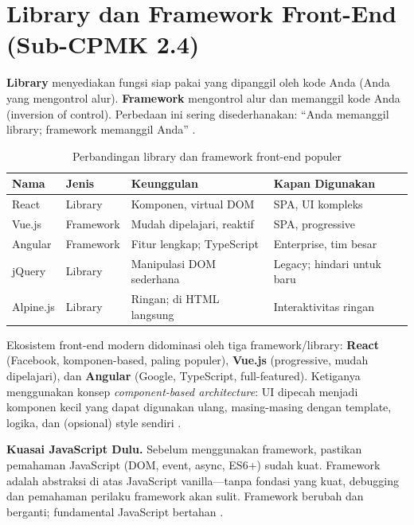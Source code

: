 \section{Library dan Framework Front-End (Sub-CPMK 2.4)}

\textbf{Library} menyediakan fungsi siap pakai yang dipanggil oleh kode Anda (Anda yang mengontrol alur). \textbf{Framework} mengontrol alur dan memanggil kode Anda (inversion of control). Perbedaan ini sering disederhanakan: ``Anda memanggil library; framework memanggil Anda'' \cite{jsInfo}.

\begin{table}[htbp]
\centering
\begin{tabular}{|P{2.5cm}|P{2cm}|P{3.5cm}|P{4cm}|}
\hline
\textbf{Nama} & \textbf{Jenis} & \textbf{Keunggulan} & \textbf{Kapan Digunakan} \\
\hline
React & Library & Komponen, virtual DOM & SPA, UI kompleks \\
\hline
Vue.js & Framework & Mudah dipelajari, reaktif & SPA, progressive \\
\hline
Angular & Framework & Fitur lengkap; TypeScript & Enterprise, tim besar \\
\hline
jQuery & Library & Manipulasi DOM sederhana & Legacy; hindari untuk baru \\
\hline
Alpine.js & Library & Ringan; di HTML langsung & Interaktivitas ringan \\
\hline
\end{tabular}
\caption{Perbandingan library dan framework front-end populer}
\end{table}

Ekosistem front-end modern didominasi oleh tiga framework/library: \textbf{React} (Facebook, komponen-based, paling populer), \textbf{Vue.js} (progressive, mudah dipelajari), dan \textbf{Angular} (Google, TypeScript, full-featured). Ketiganya menggunakan konsep \textit{component-based architecture}: UI dipecah menjadi komponen kecil yang dapat digunakan ulang, masing-masing dengan template, logika, dan (opsional) style sendiri \cite{mdnJsGuide}.

\begin{konsep}
\textbf{Kuasai JavaScript Dulu.} Sebelum menggunakan framework, pastikan pemahaman JavaScript (DOM, event, async, ES6+) sudah kuat. Framework adalah abstraksi di atas JavaScript vanilla---tanpa fondasi yang kuat, debugging dan pemahaman perilaku framework akan sulit. Framework berubah dan berganti; fundamental JavaScript bertahan \cite{mdnJsGuide}.
\end{konsep}

